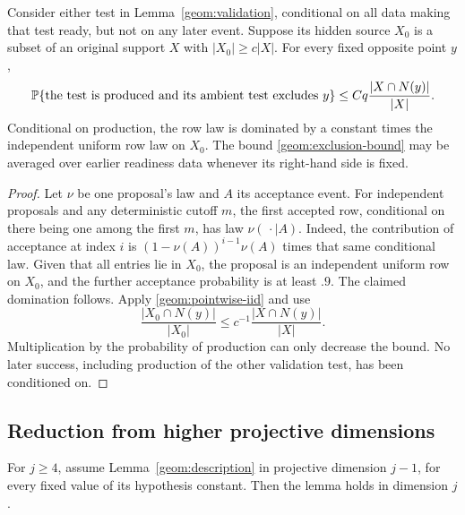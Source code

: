 

\begin{lemma}\label{geom:produced-test}
Consider either test in Lemma~\ref{geom:validation}, conditional on
all data making that test ready, but not on any later event. Suppose its
hidden source $X_0$ is a subset of an original support $X$ with
$|X_0|\geq c|X|$. For every fixed opposite point $y$,
\begin{equation}\label{geom:exclusion-bound}
 \mathbb P\{\text{the test is produced and its ambient test excludes }y\}
 \leq Cq\frac{|X\cap N(y)|}{|X|}.
\end{equation}
Conditional on production, the row law is dominated by a constant times
the independent uniform row law on $X_0$. The bound
\eqref{geom:exclusion-bound} may be averaged over earlier readiness data
whenever its right-hand side is fixed.
\end{lemma}

\begin{proof}
Let $\nu$ be one proposal's law and $A$ its acceptance event. For
independent proposals and any deterministic cutoff $m$, the first
accepted row, conditional on there being one among the first $m$, has
law $\nu(\,\cdot\mid A)$. Indeed, the contribution of acceptance at
index $i$ is $(1-\nu(A))^{i-1}\nu(A)$ times that same conditional
law. Given that all entries lie in $X_0$, the proposal is an independent
uniform row on $X_0$, and the further acceptance probability is at least
$.9$. The claimed domination follows. Apply
\eqref{geom:pointwise-iid} and use
\[
 \frac{|X_0\cap N(y)|}{|X_0|}
 \leq c^{-1}\frac{|X\cap N(y)|}{|X|}.
\]
Multiplication by the probability of production can only decrease the
bound. No later success, including production of the other validation
test, has been conditioned on.
\end{proof}

\subsection{Reduction from higher projective dimensions}

\begin{proposition}\label{geom:projection}
For $j\geq4$, assume Lemma~\ref{geom:description} in projective
dimension $j-1$, for every fixed value of its hypothesis constant.
Then the lemma holds in dimension $j$.
\end{proposition}

